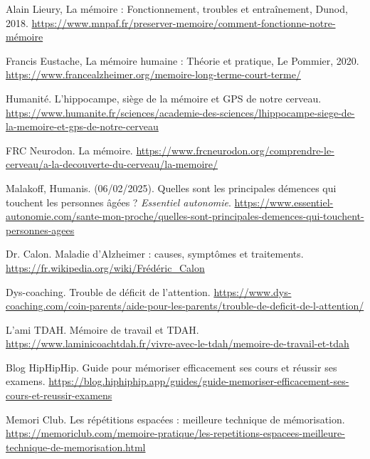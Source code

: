 \documentclass[12pt,a4paper]{report}
\begin{document}
\begin{thebibliography}{9}

        Alain Lieury, La mémoire : Fonctionnement, troubles et entraînement, Dunod, 2018.
        \url{https://www.mnpaf.fr/preserver-memoire/comment-fonctionne-notre-mémoire}

        Francis Eustache, La mémoire humaine : Théorie et pratique, Le Pommier, 2020. \break
        \url{https://www.francealzheimer.org/memoire-long-terme-court-terme/}
        
        Humanité. L'hippocampe, siège de la mémoire et GPS de notre cerveau. \break
        \url{https://www.humanite.fr/sciences/academie-des-sciences/lhippocampe-siege-de-la-memoire-et-gps-de-notre-cerveau}
        
        FRC Neurodon. La mémoire. \break
        \url{https://www.frcneurodon.org/comprendre-le-cerveau/a-la-decouverte-du-cerveau/la-memoire/}

        Malakoff, Humanis. (06/02/2025). Quelles sont les principales démences qui touchent les personnes âgées ? \textit{Essentiel autonomie}. \break
        \url{https://www.essentiel-autonomie.com/sante-mon-proche/quelles-sont-principales-demences-qui-touchent-personnes-agees}

        Dr. Calon. Maladie d'Alzheimer : causes, symptômes et traitements. \break
        \url{https://fr.wikipedia.org/wiki/Frédéric_Calon}
    
        Dys-coaching. Trouble de déficit de l'attention. \break
        \url{https://www.dys-coaching.com/coin-parents/aide-pour-les-parents/trouble-de-deficit-de-l-attention/}

        L'ami TDAH. Mémoire de travail et TDAH. \break
    \url{https://www.laminicoachtdah.fr/vivre-avec-le-tdah/memoire-de-travail-et-tdah}

        Blog HipHipHip. Guide pour mémoriser efficacement ses cours et réussir ses examens. \break
    \url{https://blog.hiphiphip.app/guides/guide-memoriser-efficacement-ses-cours-et-reussir-examens}

        Memori Club. Les répétitions espacées : meilleure technique de mémorisation. \break
    \url{https://memoriclub.com/memoire-pratique/les-repetitions-espacees-meilleure-technique-de-memorisation.html}


\end{thebibliography}
\end{document}
